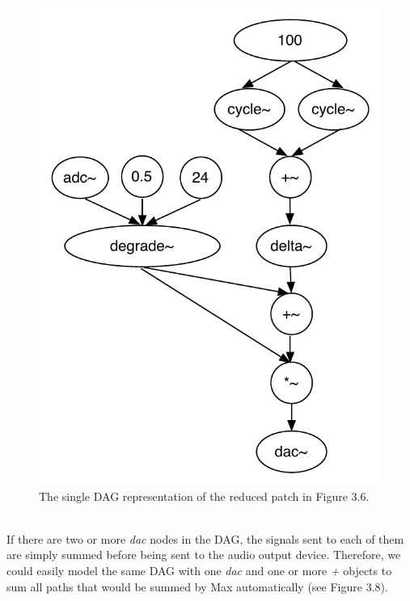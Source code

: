 \documentclass[a4paper,12pt]{report} 	%
\numberwithin{figure}{chapter}
\numberwithin{table}{chapter}
\numberwithin{equation}{chapter}
\begin{document}
\begin{flushleft}
\begin{figure}[h!]
\begin{center}
\includegraphics[scale=0.8]{MaxDAGsSendReceive2}
\caption[Reducing a Set of DAGs to a Single DAG]{The single DAG representation of the reduced patch in Figure 3.6.}
\end{center}
\end{figure}
\\
If there are two or more \emph{dac\texttildelow{}} nodes in the DAG, the signals sent to each of them are simply summed before being sent to the audio output device. Therefore, we could easily model the same DAG with one \emph{dac\texttildelow{}} and one or more \emph{+\texttildelow{}} objects to sum all paths that would be summed by Max automatically (see Figure 3.8). 
\begin{figure}[h!]
\begin{center}

\end{center}
\end{figure}
\end{flushleft}
\end{document}
